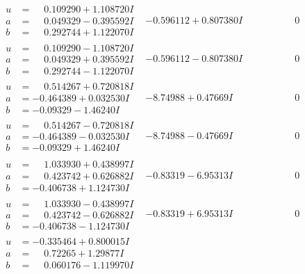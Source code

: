 \documentclass[1p]{elsarticle_modified}
\theoremstyle{definition}
\begin{document}
$$\begin{array}{c|c|c}
\begin{aligned}
u &= \phantom{-}0.109290 + 1.108720 I \\
a &= \phantom{-}0.049329 - 0.395592 I \\
b &= \phantom{-}0.292744 + 1.122070 I\end{aligned}
 & -0.596112 + 0.807380 I & \phantom{-0.000000 } 0 \\ \hline\begin{aligned}
u &= \phantom{-}0.109290 - 1.108720 I \\
a &= \phantom{-}0.049329 + 0.395592 I \\
b &= \phantom{-}0.292744 - 1.122070 I\end{aligned}
 & -0.596112 - 0.807380 I & \phantom{-0.000000 } 0 \\ \hline\begin{aligned}
u &= \phantom{-}0.514267 + 0.720818 I \\
a &= -0.464389 + 0.032530 I \\
b &= -0.09329 - 1.46240 I\end{aligned}
 & -8.74988 + 0.47669 I & \phantom{-0.000000 } 0 \\ \hline\begin{aligned}
u &= \phantom{-}0.514267 - 0.720818 I \\
a &= -0.464389 - 0.032530 I \\
b &= -0.09329 + 1.46240 I\end{aligned}
 & -8.74988 - 0.47669 I & \phantom{-0.000000 } 0 \\ \hline\begin{aligned}
u &= \phantom{-}1.033930 + 0.438997 I \\
a &= \phantom{-}0.423742 + 0.626882 I \\
b &= -0.406738 + 1.124730 I\end{aligned}
 & -0.83319 - 6.95313 I & \phantom{-0.000000 } 0 \\ \hline\begin{aligned}
u &= \phantom{-}1.033930 - 0.438997 I \\
a &= \phantom{-}0.423742 - 0.626882 I \\
b &= -0.406738 - 1.124730 I\end{aligned}
 & -0.83319 + 6.95313 I & \phantom{-0.000000 } 0 \\ \hline\begin{aligned}
u &= -0.335464 + 0.800015 I \\
a &= \phantom{-}0.72265 + 1.29877 I \\
b &= \phantom{-}0.060176 - 1.119970 I\end{aligned}

\end{array}$$
\end{document}
